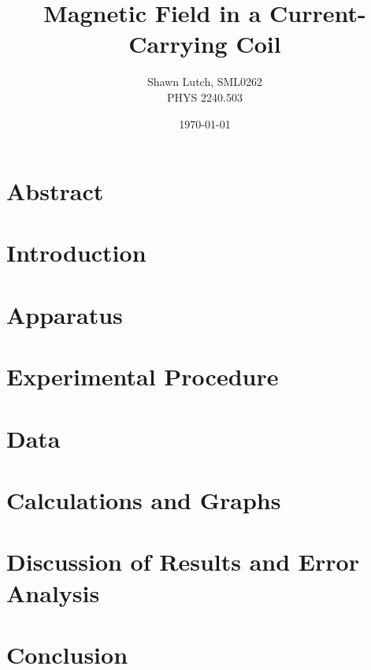 \documentclass[12pt,letterpaper,titlepage]{report}
\newcommand{\myTitle}{Magnetic Field in a Current-Carrying Coil}
\newcommand{\myName}{Shawn Lutch, SML0262}
\newcommand{\myPeriod}{PHYS 2240.503}
\begin{document}

\title{\myTitle{}}
\author{\myName{} \\ \myPeriod{}}
\date{\today}
\maketitle


\section*{Abstract}




\section*{Introduction}


\pagebreak


\section*{Apparatus}


\bigskip


\section*{Experimental Procedure}


\pagebreak


\section*{Data}




\section*{Calculations and Graphs}


\pagebreak


\section*{Discussion of Results and Error Analysis}




\section*{Conclusion}



\end{document}
